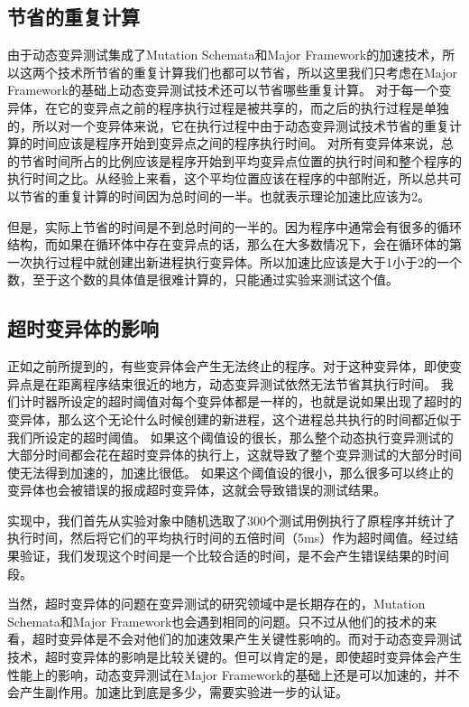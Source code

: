 \documentclass[nofonts]{ctexrep}
\begin{document}
\subsection{ 节省的重复计算}
由于动态变异测试集成了Mutation Schemata和Major Framework的加速技术，所以这两个技术所节省的重复计算我们也都可以节省，所以这里我们只考虑在Major Framework的基础上动态变异测试技术还可以节省哪些重复计算。
对于每一个变异体，在它的变异点之前的程序执行过程是被共享的，而之后的执行过程是单独的，所以对一个变异体来说，它在执行过程中由于动态变异测试技术节省的重复计算的时间应该是程序开始到变异点之间的程序执行时间。
对所有变异体来说，总的节省时间所占的比例应该是程序开始到平均变异点位置的执行时间和整个程序的执行时间之比。从经验上来看，这个平均位置应该在程序的中部附近，所以总共可以节省的重复计算的时间因为总时间的一半。也就表示理论加速比应该为2。

但是，实际上节省的时间是不到总时间的一半的。因为程序中通常会有很多的循环结构，而如果在循环体中存在变异点的话，那么在大多数情况下，会在循环体的第一次执行过程中就创建出新进程执行变异体。所以加速比应该是大于1小于2的一个数，至于这个数的具体值是很难计算的，只能通过实验来测试这个值。

\subsection{超时变异体的影响}
正如之前所提到的，有些变异体会产生无法终止的程序。对于这种变异体，即使变异点是在距离程序结束很近的地方，动态变异测试依然无法节省其执行时间。
我们计时器所设定的超时阈值对每个变异体都是一样的，也就是说如果出现了超时的变异体，那么这个无论什么时候创建的新进程，这个进程总共执行的时间都近似于我们所设定的超时阈值。
如果这个阈值设的很长，那么整个动态执行变异测试的大部分时间都会花在超时变异体的执行上，这就导致了整个变异测试的大部分时间使无法得到加速的，加速比很低。
如果这个阈值设的很小，那么很多可以终止的变异体也会被错误的报成超时变异体，这就会导致错误的测试结果。

实现中，我们首先从实验对象中随机选取了300个测试用例执行了原程序并统计了执行时间，然后将它们的平均执行时间的五倍时间（5ms）作为超时阈值。经过结果验证，我们发现这个时间是一个比较合适的时间，是不会产生错误结果的时间段。

当然，超时变异体的问题在变异测试的研究领域中是长期存在的，Mutation Schemata和Major Framework也会遇到相同的问题。只不过从他们的技术的来看，超时变异体是不会对他们的加速效果产生关键性影响的。而对于动态变异测试技术，超时变异体的影响是比较关键的。但可以肯定的是，即使超时变异体会产生性能上的影响，动态变异测试在Major Framework的基础上还是可以加速的，并不会产生副作用。加速比到底是多少，需要实验进一步的认证。
\end{document}
